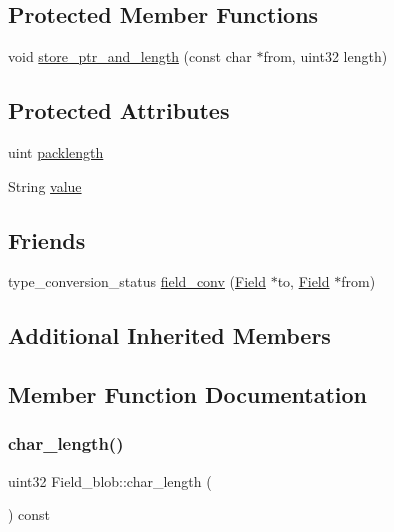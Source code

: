 \subsection*{Protected Member Functions}
\begin{DoxyCompactItemize}
\item 
void \mbox{\hyperlink{classField__blob_aecc1c7ac37e12b4eb8eb254795487757}{store\+\_\+ptr\+\_\+and\+\_\+length}} (const char $\ast$from, uint32 length)
\end{DoxyCompactItemize}
\subsection*{Protected Attributes}
\begin{DoxyCompactItemize}
\item 
uint \mbox{\hyperlink{classField__blob_a4752c1fb1007b71582e6698dcea35f19}{packlength}}
\item 
String \mbox{\hyperlink{classField__blob_abc02fd1c1c4a61a46161d1a5e14f5a16}{value}}
\end{DoxyCompactItemize}
\subsection*{Friends}
\begin{DoxyCompactItemize}
\item 
type\+\_\+conversion\+\_\+status \mbox{\hyperlink{classField__blob_ac6315ce5b8740662e0c10dd34c659fae}{field\+\_\+conv}} (\mbox{\hyperlink{classField}{Field}} $\ast$to, \mbox{\hyperlink{classField}{Field}} $\ast$from)
\end{DoxyCompactItemize}
\subsection*{Additional Inherited Members}


\subsection{Member Function Documentation}
\mbox{\label{classField__blob_af7479466787f51794b98d42baf338741}} 
\subsubsection{\texorpdfstring{char\+\_\+length()}{char\_length()}}
{\footnotesize\ttfamily uint32 Field\+\_\+blob\+::char\+\_\+length (\begin{DoxyParamCaption}{ }\end{DoxyParamCaption}) const\hspace{0.3cm}{\ttfamily [virtual]}}

